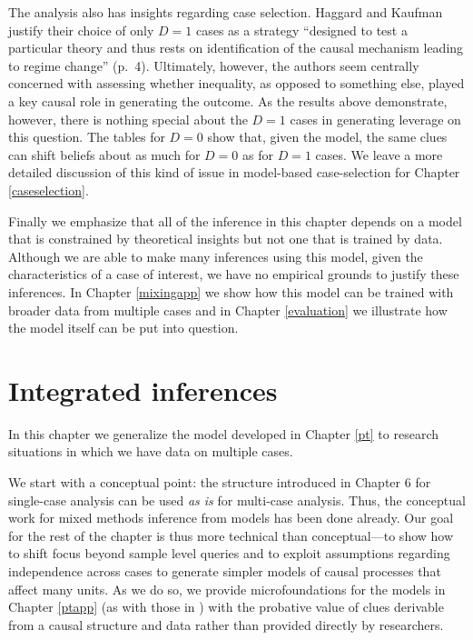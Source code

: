 \documentclass[
  12pt,
]{book}
\begin{document}
The analysis also has insights regarding case selection. Haggard and Kaufman justify their choice of only \(D=1\) cases as a strategy ``designed to test a particular theory and thus rests on identification of the causal mechanism leading to regime change'' (p.~4). Ultimately, however, the authors seem centrally concerned with assessing whether inequality, as opposed to something else, played a key causal role in generating the outcome. As the results above demonstrate, however, there is nothing special about the \(D=1\) cases in generating leverage on this question. The tables for \(D=0\) show that, given the model, the same clues can shift beliefs about as much for \(D=0\) as for \(D=1\) cases. We leave a more detailed discussion of this kind of issue in model-based case-selection for Chapter \ref{caseselection}.

Finally we emphasize that all of the inference in this chapter depends on a model that is constrained by theoretical insights but not one that is trained by data. Although we are able to make many inferences using this model, given the characteristics of a case of interest, we have no empirical grounds to justify these inferences. In Chapter \ref{mixingapp} we show how this model can be trained with broader data from multiple cases and in Chapter \ref{evaluation} we illustrate how the model itself can be put into question.

\hypertarget{mixing}{%
\chapter{Integrated inferences}\label{mixing}}

In this chapter we generalize the model developed in Chapter \ref{pt} to research situations in which we have data on multiple cases.

We start with a conceptual point: the structure introduced in Chapter 6 for single-case analysis can be used \emph{as is} for multi-case analysis. Thus, the conceptual work for mixed methods inference from models has been done already. Our goal for the rest of the chapter is thus more technical than conceptual---to show how to shift focus beyond sample level queries and to exploit assumptions regarding independence across cases to generate simpler models of causal processes that affect many units. As we do so, we provide microfoundations for the models in Chapter \ref{ptapp} (as with those in \citet{humphreys2015mixing}) with the probative value of clues derivable from a causal structure and data rather than provided directly by researchers.
\end{document}
